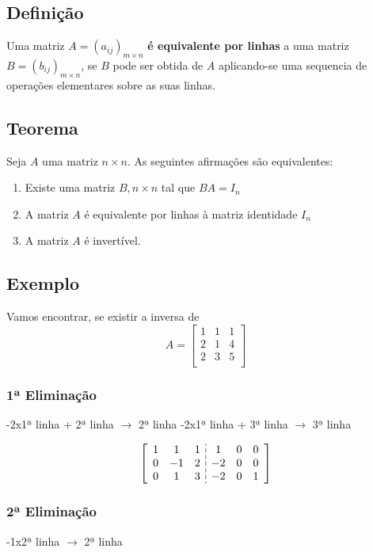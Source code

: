 \documentclass{article}
\begin{document}
\subsection{Definição}
Uma matriz $A = (a_{ij})_{m \times n}$ \textbf{é equivalente por linhas} a uma matriz $B = (b_{ij})_{m \times n}$, se $B$ pode ser 
obtida de $A$ aplicando-se uma sequencia de operações elementares sobre as suas linhas.

\subsection{Teorema}
Seja $A$ uma matriz $n \times n$. As seguintes afirmações são equivalentes:
\begin{enumerate}[label=(\alph*)]
  \item Existe uma matriz $B, n \times n$ tal que $BA = I_n$
  \item A matriz $A$ é equivalente por linhas à matriz identidade $I_n$
  \item A matriz $A$ é invertível.
\end{enumerate}

\subsection{Exemplo}
Vamos encontrar, se existir a inversa de 
$$A = 
\begin{bmatrix}
  1 & 1 & 1 \\
  2 & 1 & 4 \\
  2 & 3 & 5 \\
\end{bmatrix}$$
\subsubsection*{1ª Eliminação}
-2x1ª linha + 2ª linha $\longrightarrow $ 2ª linha \newline
-2x1ª linha + 3ª linha $\longrightarrow $ 3ª linha \newline

$$
  \setlength{\dashlinegap}{2pt}
\left[\begin{array}{ccc:ccc}
  1 & 1 & 1 & 1 & 0 & 0 \\
  0 & -1 & 2 & -2 & 0 & 0 \\
  0 & 1 & 3 & -2 & 0 & 1 \\
  \end{array}
\right]
$$

\subsubsection*{2ª Eliminação}
-1x2ª linha  $\longrightarrow $ 2ª linha \newline
\end{document}
